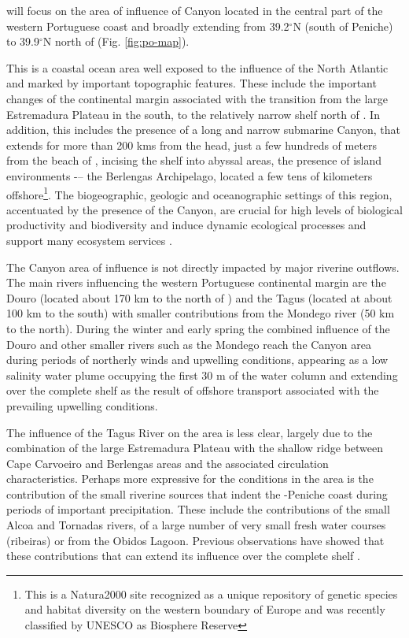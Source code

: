 \proj will focus on the area of influence of \naz Canyon located in
the central part of the western Portuguese coast and broadly extending
from 39.2$^{\circ}$N (south of Peniche) to 39.9$^{\circ}$N north of
\naz (Fig. \ref{fig:po-map}). 

This is a coastal ocean area well exposed to the influence of the
North Atlantic and marked by important topographic features. These
include the important changes of the continental margin associated
with the transition from the large Estremadura Plateau in the south,
to the relatively narrow shelf north of \naze. In addition, this
includes the presence of a long and narrow submarine \naz Canyon, that
extends for more than 200 kms from the head, just a few hundreds of
meters from the beach of \naze, incising the shelf into abyssal areas,
the presence of island environments -– the Berlengas Archipelago,
located a few tens of kilometers offshore\footnote{This is a
  Natura2000 site recognized as a unique repository of genetic species
  and habitat diversity on the western boundary of Europe and was
  recently classified by UNESCO as Biosphere Reserve}. The
biogeographic, geologic and oceanographic settings of this region,
accentuated by the presence of the \naz Canyon, are crucial for high
levels of biological productivity and biodiversity and induce dynamic
ecological processes and support many ecosystem services
.  

The \naz Canyon area of influence is not directly impacted by major
riverine outflows. The main rivers influencing the western Portuguese
continental margin are the Douro (located about 170 km to the north of
\naze) and the Tagus (located at about 100 km to the south) with
smaller contributions from the Mondego river (50 km to the
north). During the winter and early spring the combined influence of
the Douro and other smaller rivers such as the Mondego reach the \naz
Canyon area during periods of northerly winds and upwelling
conditions, appearing as a low salinity water plume occupying the
first 30 m of the water column and extending over the complete shelf
as the result of offshore transport associated with the prevailing
upwelling conditions.

The influence of the Tagus River on the area is less clear, largely
due to the combination of the large Estremadura Plateau with the
shallow ridge between Cape Carvoeiro and Berlengas areas and the
associated circulation characteristics. Perhaps more expressive for
the conditions in the area is the contribution of the small riverine
sources that indent the \naze-Peniche coast during periods of
important precipitation. These include the contributions of the small
Alcoa and Tornadas rivers, of a large number of very small fresh water
courses (ribeiras) or from the Obidos Lagoon. Previous observations
have showed  that these contributions  that can extend its influence
over the complete shelf .

